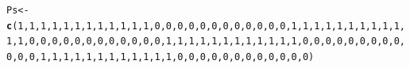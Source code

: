 \documentclass{article}\usepackage[]{graphicx}\usepackage[]{color}
\makeatletter
\newcommand{\hlnum}[1]{\textcolor[rgb]{0.686,0.059,0.569}{#1}}%
\newcommand{\hlstd}[1]{\textcolor[rgb]{0.345,0.345,0.345}{#1}}%
\newcommand{\hlkwb}[1]{\textcolor[rgb]{0.69,0.353,0.396}{#1}}%
\newcommand{\hlkwd}[1]{\textcolor[rgb]{0.737,0.353,0.396}{\textbf{#1}}}%
\newenvironment{kframe}{%
 \def\at@end@of@kframe{}%
 \ifinner\ifhmode%
  \def\at@end@of@kframe{\end{minipage}}%
  \begin{minipage}{\columnwidth}%
 \fi\fi%
 \def\FrameCommand##1{\hskip\@totalleftmargin \hskip-\fboxsep
 \colorbox{shadecolor}{##1}\hskip-\fboxsep
     \hskip-\linewidth \hskip-\@totalleftmargin \hskip\columnwidth}%
 \MakeFramed {\advance\hsize-\width
   \@totalleftmargin\z@ \linewidth\hsize
   \@setminipage}}%
 {\par\unskip\endMakeFramed%
 \at@end@of@kframe}
\newenvironment{knitrout}{}{} %
\makeatother
\begin{document}
\begin{knitrout}
\begin{kframe}
\begin{alltt}
\hlstd{Ps} \hlkwb{<-} \hlkwd{c}\hlstd{(}\hlnum{1}\hlstd{,}\hlnum{1}\hlstd{,}\hlnum{1}\hlstd{,}\hlnum{1}\hlstd{,}\hlnum{1}\hlstd{,}\hlnum{1}\hlstd{,}\hlnum{1}\hlstd{,}\hlnum{1}\hlstd{,}\hlnum{1}\hlstd{,}\hlnum{1}\hlstd{,}\hlnum{1}\hlstd{,}\hlnum{1}\hlstd{,}\hlnum{0}\hlstd{,}\hlnum{0}\hlstd{,}\hlnum{0}\hlstd{,}\hlnum{0}\hlstd{,}\hlnum{0}\hlstd{,}\hlnum{0}\hlstd{,}\hlnum{0}\hlstd{,}\hlnum{0}\hlstd{,}\hlnum{0}\hlstd{,}\hlnum{0}\hlstd{,}\hlnum{0}\hlstd{,}\hlnum{0}\hlstd{,}\hlnum{1}\hlstd{,}\hlnum{1}\hlstd{,}\hlnum{1}\hlstd{,}\hlnum{1}\hlstd{,}\hlnum{1}\hlstd{,}\hlnum{1}\hlstd{,}\hlnum{1}\hlstd{,}\hlnum{1}\hlstd{,}\hlnum{1}\hlstd{,}\hlnum{1}\hlstd{,}\hlnum{1}\hlstd{,}\hlnum{1}\hlstd{,}\hlnum{0}\hlstd{,}\hlnum{0}\hlstd{,}\hlnum{0}\hlstd{,}\hlnum{0}\hlstd{,}\hlnum{0}\hlstd{,}\hlnum{0}\hlstd{,}\hlnum{0}\hlstd{,}\hlnum{0}\hlstd{,}\hlnum{0}\hlstd{,}\hlnum{0}\hlstd{,}\hlnum{0}\hlstd{,}\hlnum{0}\hlstd{,}\hlnum{1}\hlstd{,}\hlnum{1}\hlstd{,}\hlnum{1}\hlstd{,}\hlnum{1}\hlstd{,}\hlnum{1}\hlstd{,}\hlnum{1}\hlstd{,}\hlnum{1}\hlstd{,}\hlnum{1}\hlstd{,}\hlnum{1}\hlstd{,}\hlnum{1}\hlstd{,}\hlnum{1}\hlstd{,}\hlnum{1}\hlstd{,}\hlnum{0}\hlstd{,}\hlnum{0}\hlstd{,}\hlnum{0}\hlstd{,}\hlnum{0}\hlstd{,}\hlnum{0}\hlstd{,}\hlnum{0}\hlstd{,}\hlnum{0}\hlstd{,}\hlnum{0}\hlstd{,}\hlnum{0}\hlstd{,}\hlnum{0}\hlstd{,}\hlnum{0}\hlstd{,}\hlnum{0}\hlstd{,}\hlnum{1}\hlstd{,}\hlnum{1}\hlstd{,}\hlnum{1}\hlstd{,}\hlnum{1}\hlstd{,}\hlnum{1}\hlstd{,}\hlnum{1}\hlstd{,}\hlnum{1}\hlstd{,}\hlnum{1}\hlstd{,}\hlnum{1}\hlstd{,}\hlnum{1}\hlstd{,}\hlnum{1}\hlstd{,}\hlnum{1}\hlstd{,}\hlnum{0}\hlstd{,}\hlnum{0}\hlstd{,}\hlnum{0}\hlstd{,}\hlnum{0}\hlstd{,}\hlnum{0}\hlstd{,}\hlnum{0}\hlstd{,}\hlnum{0}\hlstd{,}\hlnum{0}\hlstd{,}\hlnum{0}\hlstd{,}\hlnum{0}\hlstd{,}\hlnum{0}\hlstd{,}\hlnum{0}\hlstd{)}

\end{alltt}
\end{kframe}
\end{knitrout}
\end{document}
